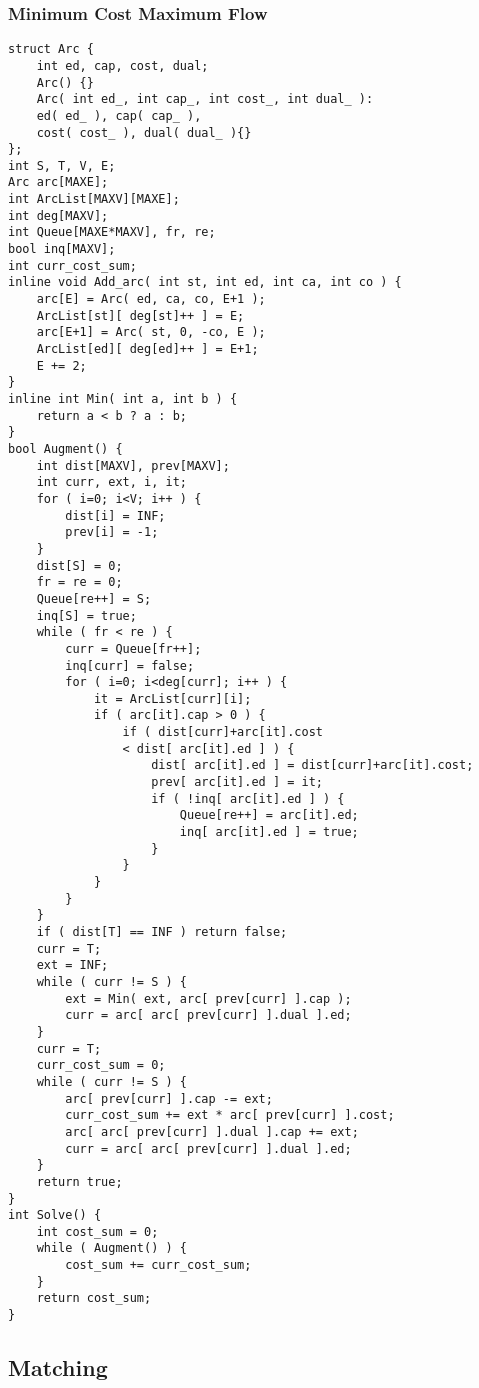 \documentclass[10pt,twocolumn,oneside]{article}
\begin{document}
\subsubsection{Minimum Cost Maximum Flow}
\begin{verbatim}
struct Arc {
    int ed, cap, cost, dual;
    Arc() {}
    Arc( int ed_, int cap_, int cost_, int dual_ ):
    ed( ed_ ), cap( cap_ ),
    cost( cost_ ), dual( dual_ ){}
};
int S, T, V, E;
Arc arc[MAXE];
int ArcList[MAXV][MAXE];
int deg[MAXV];
int Queue[MAXE*MAXV], fr, re;
bool inq[MAXV];
int curr_cost_sum;
inline void Add_arc( int st, int ed, int ca, int co ) {
    arc[E] = Arc( ed, ca, co, E+1 );
    ArcList[st][ deg[st]++ ] = E;
    arc[E+1] = Arc( st, 0, -co, E );
    ArcList[ed][ deg[ed]++ ] = E+1;
    E += 2;
}
inline int Min( int a, int b ) {
    return a < b ? a : b;
}
bool Augment() {
    int dist[MAXV], prev[MAXV];
    int curr, ext, i, it;
    for ( i=0; i<V; i++ ) {
        dist[i] = INF;
        prev[i] = -1;
    }
    dist[S] = 0;
    fr = re = 0;
    Queue[re++] = S;
    inq[S] = true;
    while ( fr < re ) {
        curr = Queue[fr++];
        inq[curr] = false;
        for ( i=0; i<deg[curr]; i++ ) {
            it = ArcList[curr][i];
            if ( arc[it].cap > 0 ) {
                if ( dist[curr]+arc[it].cost
                < dist[ arc[it].ed ] ) {
                    dist[ arc[it].ed ] = dist[curr]+arc[it].cost;
                    prev[ arc[it].ed ] = it;
                    if ( !inq[ arc[it].ed ] ) {
                        Queue[re++] = arc[it].ed;
                        inq[ arc[it].ed ] = true;
                    }
                }
            }
        }
    }
    if ( dist[T] == INF ) return false;
    curr = T;
    ext = INF;
    while ( curr != S ) {
        ext = Min( ext, arc[ prev[curr] ].cap );
        curr = arc[ arc[ prev[curr] ].dual ].ed;
    }
    curr = T;
    curr_cost_sum = 0;
    while ( curr != S ) {
        arc[ prev[curr] ].cap -= ext;
        curr_cost_sum += ext * arc[ prev[curr] ].cost;
        arc[ arc[ prev[curr] ].dual ].cap += ext;
        curr = arc[ arc[ prev[curr] ].dual ].ed;
    }
    return true;
}
int Solve() {
    int cost_sum = 0;
    while ( Augment() ) {
        cost_sum += curr_cost_sum;
    }
    return cost_sum;
}
\end{verbatim}
\subsection{Matching}
\end{document}
